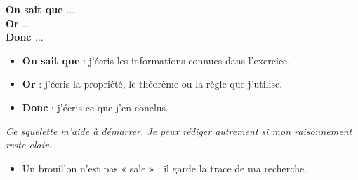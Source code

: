 \documentclass[10pt,a4paper]{article}
\begin{document}
\begin{minipage}[t]{0.485\textwidth}
\vspace{0pt}


\begin{tcolorbox}[
  enhanced,
  colback=AttentionC!5,
  colframe=AttentionC!70,
  boxrule=0.7pt,
  arc=2mm,
  title={\sffamily\bfseries Quand je justifie avec une propriété},
  coltitle=AttentionC,
  fonttitle=\normalsize,
  left=2.5mm,right=2.5mm,top=1.4mm,bottom=1.4mm
]

\centering
{\sffamily\bfseries\large
On sait que \(\ldots\)\\[0.25em]
Or \(\ldots\)\\[0.25em]
Donc \(\ldots\)}
\par

\vspace{0.4em}

\raggedright
\small
\begin{itemize}
  \item \textbf{On sait que} : j'écris les informations connues dans l'exercice.

  \item \textbf{Or} : j'écris la propriété, le théorème ou la règle que j'utilise.

  \item \textbf{Donc} : j'écris ce que j'en conclus.
\end{itemize}

\begin{center}
\scriptsize\itshape
Ce squelette m'aide à démarrer.
Je peux rédiger autrement si mon raisonnement reste clair.
\end{center}

\end{tcolorbox}

\vspace{0.3em}


\begin{tcolorbox}[
  enhanced,
  colback=white,
  colframe=NeutreC!55,
  boxrule=0.6pt,
  arc=2mm,
  title={\sffamily\bfseries Mon brouillon fait partie du travail},
  coltitle=TitreC,
  fonttitle=\normalsize,
  left=2.5mm,right=2.5mm,top=1.4mm,bottom=1.4mm
]
\small
\begin{itemize}
  \item Un brouillon n'est pas « sale » : il garde la trace de ma recherche.


\end{itemize}
\end{tcolorbox}
\end{minipage}
\end{document}
